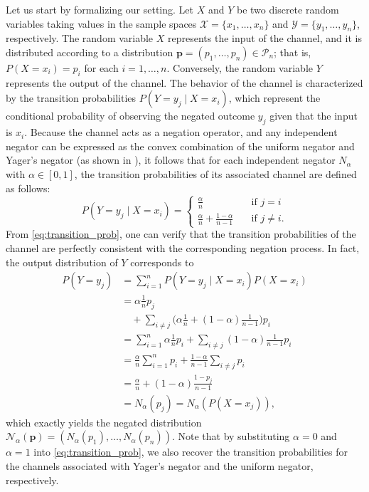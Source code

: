 \documentclass[pdflatex,sn-basic,iicol]{sn-jnl}%
\theoremstyle{thmstyleone}%
\theoremstyle{thmstyletwo}%
\theoremstyle{thmstylethree}%
\newcommand{\N}{\mathcal{N}}
\newcommand{\cP}{\mathcal{P}}
\newcommand{\bp}{\mathbf{p}}
\begin{document}
Let us start by formalizing our setting. Let $X$ and $Y$ be two discrete random variables taking values in the sample spaces $\mathcal{X}=\{x_1,\dots,x_n\}$ and $\mathcal{Y}=\{y_1,\dots,y_n\}$, respectively. The random variable $X$ represents the input of the channel, and it is distributed according to a  distribution $\bp=(p_1,\dots,p_n)\in\cP_n$; that is, $P(X=x_i)=p_i$ for each $i=1,\dots,n$. Conversely, the random variable $Y$ represents the output of the channel. The behavior of the channel is characterized by the transition probabilities ${P(Y=y_j\mid X=x_i)}$, which represent the conditional probability of observing the negated outcome $y_j$ given that the input is $x_i$. Because the channel acts as a negation operator, and any independent negator can be expressed as the convex combination of the uniform negator and Yager's negator (as shown in \cite{klein2022some}), it follows that for each independent negator $N_\alpha$ with $\alpha\in[0,1]$, the transition probabilities of its associated channel are defined as follows:
\begin{equation}\label{eq:transition_prob}
    P(Y=y_j\mid X=x_i) = \begin{cases}
        \frac{\alpha}{n} \quad&\mbox{if } j=i\\
        \frac{\alpha}{n} + \frac{1-\alpha}{n-1}\quad&\mbox{if } j\neq i.
    \end{cases}
\end{equation}
From \eqref{eq:transition_prob}, one can verify that the transition probabilities of the channel are perfectly consistent with the corresponding negation process. In fact, the output distribution of $Y$ corresponds to
\begin{align*}
    P(Y=y_j)&=\sum_{i=1}^n P(Y=y_j\mid X=x_i)P(X=x_i)\\
    &=\alpha\frac{1}{n}p_j \\&\quad+ \sum_{i\neq j}\Bigg(\alpha\frac{1}{n}+ (1-\alpha)\frac{1}{n-1}\Bigg)p_i\\
    &= \sum_{i=1}^n \alpha\frac{1}{n}p_i + \sum_{i\neq j} (1-\alpha)\frac{1}{n-1}p_i\\
    &=\frac{\alpha}{n} \sum_{i=1}^n p_i + \frac{1-\alpha}{n-1}\sum_{i\neq j}p_i\\
    &=\frac{\alpha}{n} + (1-\alpha)\frac{1-p_j}{n-1}\\
    &=N_\alpha(p_j)=N_\alpha(P(X=x_j)),
\end{align*}
which exactly yields the negated distribution $\N_\alpha(\bp)=(N_\alpha(p_1),\dots,N_\alpha(p_n))$.
Note that by substituting $\alpha=0$ and $\alpha=1$ into \eqref{eq:transition_prob}, we also recover the transition probabilities for the channels associated with Yager's negator and the uniform negator, respectively.
\end{document}
